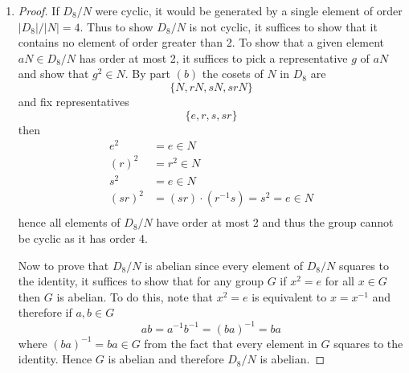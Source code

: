 \documentclass[12pt]{article}
\begin{document}
\begin{enumerate}
    \item[(c)]
    \begin{proof}
        If $D_8/N$ were cyclic, it would be generated by a single element
        of order $|D_8|/|N| = 4$. Thus to show $D_8/N$ is not cyclic, it suffices
        to show that it contains no element of order greater than 2. To show that
        a given element $aN \in D_8/N$ has order at most 2, it suffices to pick
        a representative $g$ of $aN$ and show that $g^2 \in N$. By part $(b)$ the cosets of $N$ in $D_8$
        are
        \[\{ N, rN, sN, srN \} \]
        and fix representatives
        \[ \{ e, r, s, sr \} \]
        then
        \begin{align*}
            e^2 &= e \in N \\
            (r)^2 &= r^2 \in N \\
            s^2 &= e \in N \\
            (sr)^2 &= (sr) \cdot (r^{-1}s) = s^2 = e \in N \\
        \end{align*}
        hence all elements of $D_8/N$ have order at most 2 and thus the group cannot be cyclic
        as it has order 4.

        Now to prove that $D_8/N$ is abelian since every element of $D_8/N$ squares to the identity, it suffices to show that for any group $G$ if
        $x^2 = e$ for all $x \in G$ then $G$ is abelian. To do this, note that $x^2 = e$
        is equivalent to $x = x^{-1}$ and therefore if $a, b \in G$
        \[ ab = a^{-1}b^{-1} = (ba)^{-1} = ba \]
        where $(ba)^{-1} = ba \in G$ from the fact that every element in $G$ squares to the identity.
        Hence $G$ is abelian and therefore $D_8/N$ is abelian.
    \end{proof}
\end{enumerate}
\end{document}
